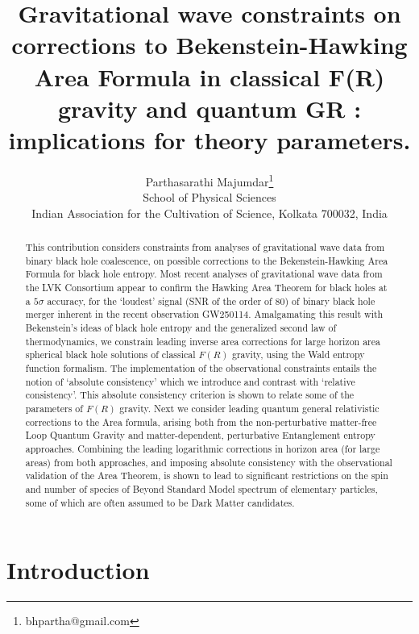 \documentclass[11pt]{article}
\begin{document}
\title{Gravitational wave constraints on corrections to Bekenstein-Hawking Area Formula in classical F(R) gravity and quantum GR : implications for theory parameters.}
\author{Parthasarathi Majumdar\footnote{bhpartha@gmail.com} \\School of Physical Sciences \\Indian Association for the Cultivation of Science, Kolkata 700032, India}
\maketitle
\begin{abstract}

This contribution considers constraints from analyses of gravitational wave data from binary black hole coalescence, on possible corrections to the Bekenstein-Hawking Area Formula for black hole entropy. Most recent analyses of gravitational wave data from the LVK Consortium appear to confirm the Hawking Area Theorem for black holes at a $5 \sigma$ accuracy, for the `loudest' signal (SNR of the order of $80$) of binary black hole merger inherent in the recent observation GW250114. Amalgamating this result with Bekenstein's ideas of black hole entropy and the generalized second law of thermodynamics, we constrain leading inverse area corrections for large horizon area spherical black hole solutions of classical $F(R)$ gravity, using the Wald entropy function formalism. The implementation of the observational constraints entails the notion of `absolute consistency' which we introduce and contrast with `relative consistency'. This absolute consistency criterion is shown to relate some of the parameters of $F(R)$ gravity. Next we consider  leading quantum general relativistic corrections to the Area formula, arising both from the non-perturbative matter-free Loop Quantum Gravity and matter-dependent, perturbative  Entanglement entropy approaches. Combining the leading logarithmic corrections in horizon area (for large areas) from both approaches, and imposing absolute consistency with the observational validation of the Area Theorem, is shown to lead to significant restrictions on the spin and number of species of Beyond Standard Model spectrum of elementary particles, some of which are often assumed to be Dark Matter candidates.    
\end{abstract} 
\section{Introduction}
\end{document}
